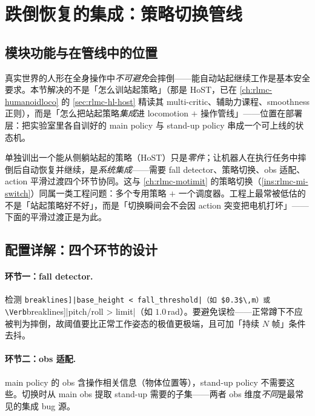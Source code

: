 \section{跌倒恢复的集成：策略切换管线}\label{sec:rlmc-wbc-recovery}

\subsection{模块功能与在管线中的位置}
真实世界的人形在全身操作中\emph{不可避免}会摔倒——能自动站起继续工作是基本安全要求。本节解决的不是「怎么训站起策略」（那是 HoST，已在 \cref{ch:rlmc-humanoidloco} 的 \cref{sec:rlmc-hl-host} 精读其 multi-critic、辅助力课程、smoothness 正则），而是「怎么把站起策略\emph{集成}进 locomotion $+$ 操作管线」——位置在部署层：把实验室里各自训好的 main policy 与 stand-up policy 串成一个可上线的状态机。

\begin{insight}[跌倒恢复是「系统」问题，不是「策略」问题]\label{ins:rlmc-wbc-system}
单独训出一个能从侧躺站起的策略（HoST）只是\emph{零件}；让机器人在执行任务中摔倒后自动恢复并继续，是\emph{系统集成}——需要 fall detector、策略切换、obs 适配、action 平滑过渡四个环节协同。这与 \cref{ch:rlmc-motimit} 的策略切换（\cref{ins:rlmc-mi-switch}）同属一类工程问题：多个专用策略 $+$ 一个调度器。工程上最常被低估的不是「站起策略好不好」，而是「切换瞬间会不会因 action 突变把电机打坏」——下面的平滑过渡正是为此。
\end{insight}

\subsection{配置详解：四个环节的设计}

\paragraph{环节一：fall detector.}
检测 \Verb[breaklines]|base_height < fall_threshold|（如 $0.3$\,m）或 \Verb[breaklines]|pitch/roll > limit|（如 $1.0$\,rad）。要避免误检——正常蹲下不应被判为摔倒，故阈值要比正常工作姿态的极值更极端，且可加「持续 $N$ 帧」条件去抖。

\paragraph{环节二：obs 适配.}
main policy 的 obs 含操作相关信息（物体位置等），stand-up policy 不需要这些。切换时从 main obs 提取 stand-up 需要的子集——两者 obs 维度\emph{不同}是最常见的集成 bug 源。

